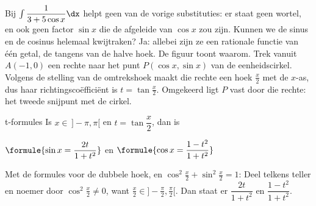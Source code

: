 Bij $\int \dfrac{1}{3 + 5\cos x}\dx$ helpt geen van de vorige substituties: er staat geen wortel, en ook geen factor $\sin x$ die de afgeleide van $\cos x$ zou zijn. Kunnen we de sinus en de cosinus helemaal kwijtraken? Ja: allebei zijn ze een rationale functie van één getal, de tangens van de halve hoek. De figuur toont waarom. Trek vanuit $A(-1, 0)$ een rechte naar het punt $P(\cos x, \sin x)$ van de eenheidscirkel. Volgens de stelling van de omtrekshoek maakt die rechte een hoek $\tfrac x2$ met de $x$-as, dus haar richtingscoëfficiënt is $t = \tan\tfrac x2$. Omgekeerd ligt $P$ vast door die rechte: het tweede snijpunt met de cirkel.

\begin{theorie}
\begin{minipage}[t]{.64\linewidth}
\vspace{0pt}
\begin{stelling}{t-formules}
Is $x \in \,]-\pi, \pi[$ en $t = \tan\dfrac x2$, dan is

\vspace{1mm}
\qquad $\formule{\sin x = \dfrac{2t}{1 + t^2}}$ \qquad en \qquad $\formule{\cos x = \dfrac{1 - t^2}{1 + t^2}}$
\end{stelling}
\end{minipage}\hfill
\begin{minipage}[t]{.32\linewidth}
\vspace{0pt}
\centering
{}
\end{minipage}

\begin{bewijs}
Met de formules voor de dubbele hoek, en $\cos^2\tfrac x2 + \sin^2\tfrac x2 = 1$:
Deel telkens teller en noemer door $\cos^2\tfrac x2 \neq 0$, want $\tfrac x2 \in \bigl]-\tfrac{\pi}{2}, \tfrac{\pi}{2}\bigr[$. Dan staat er $\dfrac{2t}{1 + t^2}$ en $\dfrac{1 - t^2}{1 + t^2}$.
\end{bewijs}
\end{theorie}


